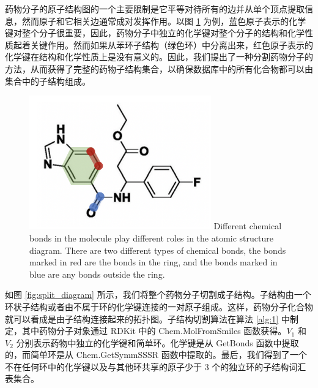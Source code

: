 药物分子的原子结构图的一个主要限制是它平等对待所有的边并从单个顶点提取信息，然而原子和它相关边通常成对发挥作用。以图 \ref{fig:invalid} 为例，蓝色原子表示的化学键对整个分子很重要，因此，药物分子中独立的化学键对整个分子的结构和化学性质起着关键作用。然而如果从苯环子结构（绿色环）中分离出来，红色原子表示的化学键在结构和化学性质上是没有意义的。因此，我们提出了一种分割药物分子的方法，从而获得了完整的药物子结构集合，以确保数据库中的所有化合物都可以由集合中的子结构组成。

\begin{figure}[!htbp] 
\centering
\includegraphics[width=0.7\textwidth]  {imgs/invalid.png}
{Different chemical bonds in the molecule play different roles in the atomic structure diagram. There are two different types of chemical bonds, the bonds marked in red are the bonds in the ring, and the bonds marked in blue are any bonds outside the ring.}
\label{fig:invalid}
\end{figure}

如图 \ref{fig:split_diagram} 所示，我们将整个药物分子切割成子结构。子结构由一个环状子结构或者由不属于环的化学键连接的一对原子组成。这样，药物分子化合物就可以看成是由子结构连接起来的拓扑图。子结构切割算法在算法 \ref{alg:1} 中制定，其中药物分子对象通过 RDKit 中的 Chem.MolFromSmiles 函数获得。$V_1$ 和 $V_2$ 分别表示药物中独立的化学键和简单环。化学键是从 GetBonds 函数中提取的，而简单环是从 Chem.GetSymmSSSR 函数中提取的。最后，我们得到了一个不在任何环中的化学键以及与其他环共享的原子少于 3 个的独立环的子结构词汇表集合。

